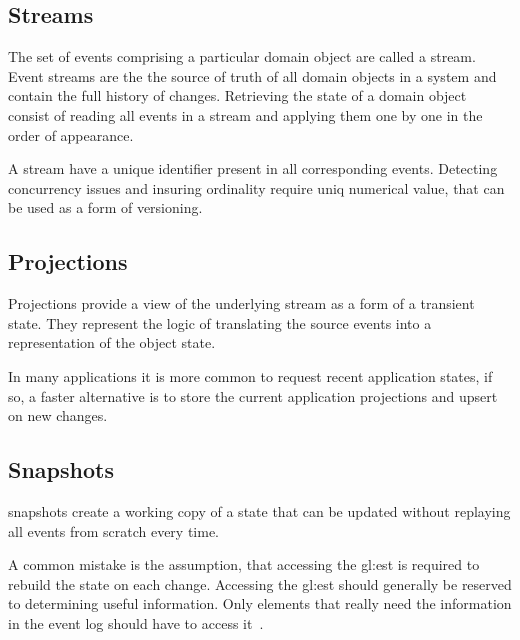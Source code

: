 
\subsection{Streams}

The set of events comprising a particular domain object are called a stream. Event streams are the the source of truth of all domain objects in a system and contain the full history of changes. Retrieving the state of a domain object consist of reading all events in a stream and applying them one by one in the order of appearance.

A stream have a unique identifier present in all corresponding events. Detecting concurrency issues and insuring ordinality require uniq numerical value, that can be used as a form of versioning.

\subsection{Projections}

Projections provide a view of the underlying stream as a form of a transient state. They represent the logic of translating the source events into a representation of the object state.

In many applications it is more common to request recent application states, if so, a faster alternative is to store the current application projections and upsert on new changes.

\subsection{Snapshots}\label{subsec:snap}

snapshots create a working copy of a state that can be updated without replaying all events from scratch every time.

A common mistake is the assumption, that accessing the \gls{gl:est} is required to rebuild the state on each change. Accessing the \gls{gl:est} should generally be reserved to determining useful information. Only elements that really need the information in the event log should have to access it~\citep{esvsed}.


